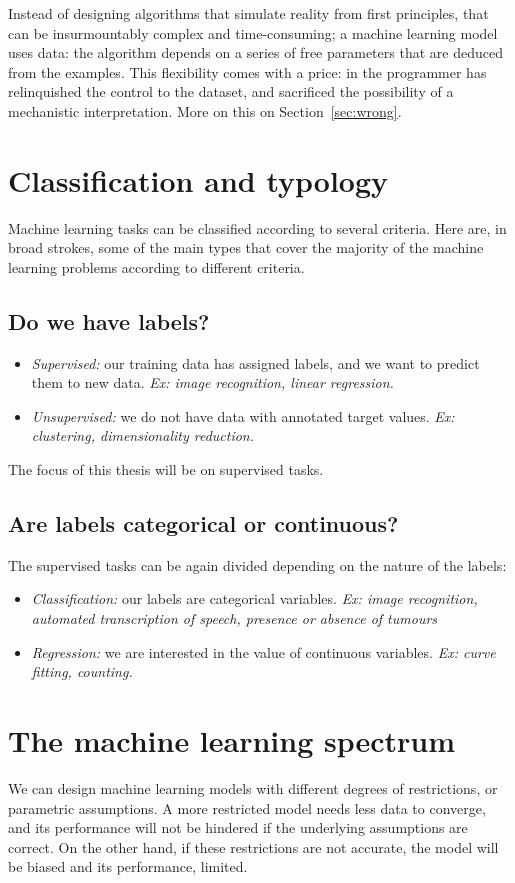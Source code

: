 Instead of designing algorithms that simulate reality from first principles, that can be insurmountably complex and time-consuming; a machine learning model uses data: the algorithm depends on a series of free parameters that are deduced from the examples.
This flexibility comes with a price: in the programmer has relinquished the control to the dataset, and sacrificed the possibility of a mechanistic interpretation.
More on this on Section~\ref{sec:wrong}.

\section{Classification and typology}
Machine learning tasks can be classified according to several criteria.
Here are, in broad strokes, some of the main types that cover the majority of the machine learning problems according to different criteria.

\subsection{Do we have labels?}
\begin{itemize}
\item \emph{Supervised:} our training data has assigned labels, and we want to predict them to new data. \emph{Ex: image recognition, linear regression.}
\item \emph{Unsupervised:} we do not have data with annotated target values. \emph{Ex: clustering, dimensionality reduction.}
\end{itemize}

The focus of this thesis will be on supervised tasks.

\subsection{Are labels categorical or continuous?}
The supervised tasks can be again divided depending on the nature of the labels:
\begin{itemize}
\item \emph{Classification:} our labels are categorical variables. \emph{Ex: image recognition, automated transcription of speech, presence or absence of tumours}
\item \emph{Regression:} we are interested in the value of continuous variables. \emph{Ex: curve fitting, counting.}
\end{itemize}

\section{The machine learning spectrum}
We can design machine learning models with different degrees of restrictions, or parametric assumptions.
A more restricted model needs less data to converge, and its performance will not be hindered if the underlying assumptions are correct.
On the other hand, if these restrictions are not accurate, the model will be biased and its performance, limited.

